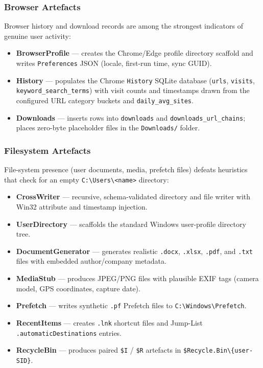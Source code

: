 \documentclass[12pt,a4paper]{article}
\begin{document}
\subsubsection{Browser Artefacts}
Browser history and download records are among the strongest indicators of
genuine user activity:

\begin{itemize}[noitemsep,leftmargin=2em]
  \item \textbf{BrowserProfile} — creates the Chrome/Edge profile directory
        scaffold and writes \texttt{Preferences} JSON (locale, first-run time,
        sync GUID).
  \item \textbf{History} — populates the Chrome \texttt{History} SQLite
        database (\texttt{urls}, \texttt{visits},
        \texttt{keyword\_search\_terms}) with visit counts and timestamps
        drawn from the configured URL category buckets and
        \texttt{daily\_avg\_sites}.
  \item \textbf{Downloads} — inserts rows into \texttt{downloads} and
        \texttt{downloads\_url\_chains}; places zero-byte placeholder files in
        the \texttt{Downloads/} folder.
\end{itemize}

\subsubsection{Filesystem Artefacts}
File-system presence (user documents, media, prefetch files) defeats heuristics
that check for an empty \texttt{C:\textbackslash Users\textbackslash<name>}
directory:

\begin{itemize}[noitemsep,leftmargin=2em]
  \item \textbf{CrossWriter} — recursive, schema-validated directory and file
        writer with Win32 attribute and timestamp injection.
  \item \textbf{UserDirectory} — scaffolds the standard Windows user-profile
        directory tree.
  \item \textbf{DocumentGenerator} — generates realistic \texttt{.docx},
        \texttt{.xlsx}, \texttt{.pdf}, and \texttt{.txt} files with embedded
        author/company metadata.
  \item \textbf{MediaStub} — produces JPEG/PNG files with plausible EXIF tags
        (camera model, GPS coordinates, capture date).
  \item \textbf{Prefetch} — writes synthetic \texttt{.pf} Prefetch files to
        \texttt{C:\textbackslash Windows\textbackslash Prefetch}.
  \item \textbf{RecentItems} — creates \texttt{.lnk} shortcut files and
        Jump-List \texttt{.automaticDestinations} entries.
  \item \textbf{RecycleBin} — produces paired \texttt{\$I} / \texttt{\$R}
        artefacts in \texttt{\$Recycle.Bin\textbackslash\{user-SID\}}.
\end{itemize}
\end{document}
